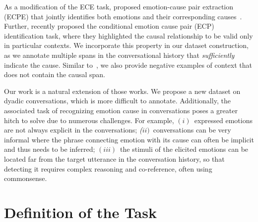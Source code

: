 \documentclass[smallextended]{svjour3}
\newcommand\0{\hphantom{0}}
\begin{document}
As a modification of the ECE task, \citet{DBLP:conf/acl/XiaD19} proposed emotion-cause pair extraction (ECPE) that jointly identifies both emotions and their corresponding causes~\cite{DBLP:conf/emnlp/ChenHCL18}. Further, \citet{chen-etal-2020-conditional} recently proposed the conditional emotion cause pair (ECP) identification task, where they highlighted the causal relationship to be valid only in particular contexts. We incorporate this property in our dataset construction, as we annotate multiple spans in the conversational history that \textit{sufficiently} indicate the cause. Similar to~\citet{chen-etal-2020-conditional}, we also provide negative examples of context that does not contain the causal span. 

Our work is a natural extension of those works. We propose a new dataset on dyadic conversations, which is more difficult to annotate. Additionally, the associated task of recognizing emotion cause in conversations poses a greater hitch to solve due to numerous challenges. For example, \textit{$(i)$}~expressed emotions are not always explicit in the conversations; \textit{($ii)$}~conversations can be very informal where the phrase connecting emotion with its cause can often be implicit and thus needs to be inferred; \textit{$(iii)$}~the stimuli of the elicited emotions can be located far from the target utterance in the conversation history, so that detecting it requires complex reasoning and co-reference, often using commonsense.






























\section{Definition of the Task}
\label{sec:terminology}
\end{document}
